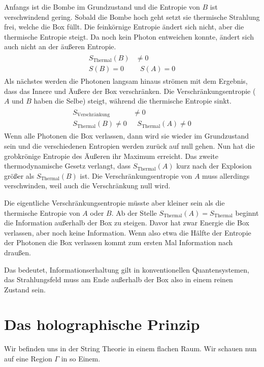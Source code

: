 \documentclass[ngerman]{scrartcl}
\begin{document}
Anfangs ist die Bombe im Grundzustand und die Entropie von $B$ ist verschwindend gering.
Sobald die Bombe hoch geht setzt sie thermische Strahlung frei, welche die Box füllt. Die feinkörnige Entropie ändert sich nicht, aber die thermische Entropie steigt. Da noch kein Photon entweichen konnte, ändert sich auch nicht an der äußeren Entropie.
	\begin{align}
		\begin{aligned}
			S_{\text{Thermal}} (B) &\neq 0 \\
			S(B) = 0 &~~~ S(A) = 0
		\end{aligned}
	\end{align}
Als nächstes werden die Photonen langsam hinaus strömen mit dem Ergebnis, dass das Innere und Äußere der Box verschränken. Die Verschränkungsentropie ($A$ und $B$ haben die Selbe) steigt, während die thermische Entropie sinkt. 
	\begin{align}
	\begin{aligned}
	S_{\text{Verschränkung}} &\neq 0 \\
	S_{\text{Thermal}} (B) \neq 0 &~~~ S_{\text{Thermal}}(A) \neq 0
	\end{aligned}
	\end{align}
Wenn alle Photonen die Box verlassen, dann wird sie wieder im Grundzustand sein und die verschiedenen Entropien werden zurück auf null gehen.
Nun hat die grobkrönige Entropie des Äußeren ihr Maximum erreicht.
Das zweite thermodynamische Gesetz verlangt, dass $S_{\text{Thermal}}(A)$ kurz nach der Explosion größer als $S_{\text{Thermal}}(B)$ ist. Die Verschränkungsentropie von $A$ muss allerdings verschwinden, weil auch die Verschränkung null wird. 

Die eigentliche Verschränkungsentropie müsste aber kleiner sein als die thermische Entropie von $A$ oder $B$. Ab der Stelle $S_{\text{Thermal}}(A) = S_{\text{Thermal}}$ beginnt die Information außerhalb der Box zu steigen. Davor hat zwar Energie die Box verlassen, aber noch keine Information. Wenn also etwa die Hälfte der Entropie der Photonen die Box verlassen kommt zum ersten Mal Information nach draußen.

Das bedeutet, Informationserhaltung gilt in konventionellen Quantensystemen, das Strahlungsfeld muss am Ende außerhalb der Box also in einem reinen Zustand sein.
	
\FloatBarrier
\section{Das holographische Prinzip}
Wir befinden uns in der String Theorie in einem flachen Raum. Wir schauen nun auf eine Region $\Gamma$ in so Einem. 
\end{document}
